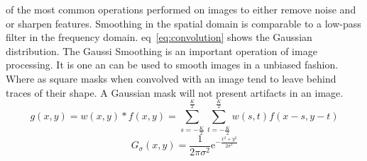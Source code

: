 \documentclass[letterpaper,10pt]{article}
\begin{document}
  of the most common operations performed on images to either remove noise and or sharpen features. Smoothing in the spatial domain is comparable to a low-pass filter in the frequency domain. eq~\ref{eq:convolution} shows the Gaussian distribution. The Gaussi
Smoothing is an important operation of image processing. It is one an can be used to smooth images in a unbiased fashion. Where as square masks when convolved with an image tend to leave behind traces of their shape. A Gaussian mask will not present artifacts in an image.
\begin{equation}
g(x,y)=w(x,y)*f(x,y)=\sum_{s=-\frac{K}{2}}^{\frac{K}{2}}\sum_{t=-\frac{K}{2}}^{\frac{K}{2}}w(s,t)f(x-s,y-t)
\label{eq:convolution}
\end{equation}
\begin{equation}
G_{\sigma}(x,y)=\frac{1}{2\pi \sigma^2}\mathrm{e}^{-\frac{x^2+y^2}{2\sigma^2}}
\label{eq:gaussian}
\end{equation}
\end{document}
